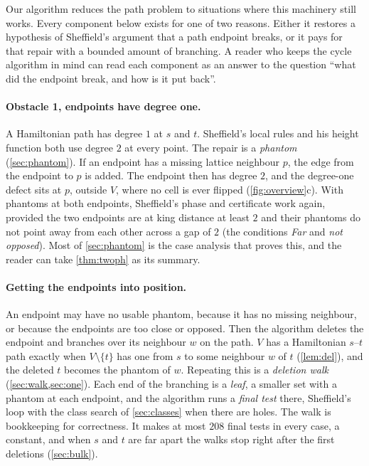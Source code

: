 \documentclass[11pt]{article}
\theoremstyle{plain}
\theoremstyle{definition}
\theoremstyle{remark}
\begin{document}
Our algorithm reduces the path problem to situations where this machinery still works.
Every component below exists for one of two reasons.
Either it restores a hypothesis of Sheffield's argument that a path endpoint breaks, or it pays for
that repair with a bounded amount of branching.
A reader who keeps the cycle algorithm in mind can read each component as an answer to the
question ``what did the endpoint break, and how is it put back''.

\paragraph{Obstacle 1, endpoints have degree one.}
A Hamiltonian path has degree $1$ at $s$ and $t$.
Sheffield's local rules and his height function both use degree $2$ at every point.
The repair is a \emph{phantom} (\cref{sec:phantom}).
If an endpoint has a missing lattice neighbour $p$, the edge from the endpoint to $p$ is added.
The endpoint then has degree $2$, and the degree-one defect sits at $p$, outside $V$, where no cell
is ever flipped (\cref{fig:overview}c).
With phantoms at both endpoints, Sheffield's phase and certificate work again, provided the two
endpoints are at king distance at least $2$ and their phantoms do not point away from each other
across a gap of $2$ (the conditions \emph{Far} and \emph{not opposed}).
Most of \cref{sec:phantom} is the case analysis that proves this, and the reader can take
\cref{thm:twoph} as its summary.

\paragraph{Getting the endpoints into position.}
An endpoint may have no usable phantom, because it has no missing neighbour, or because the
endpoints are too close or opposed.
Then the algorithm deletes the endpoint and branches over its neighbour $w$ on the path.
$V$ has a Hamiltonian $s$--$t$ path exactly when $V\setminus\{t\}$ has one from $s$ to some neighbour
$w$ of $t$ (\cref{lem:del}), and the deleted $t$ becomes the phantom of $w$.
Repeating this is a \emph{deletion walk} (\cref{sec:walk,sec:one}).
Each end of the branching is a \emph{leaf}, a smaller set with a phantom at each endpoint, and the
algorithm runs a \emph{final test} there, Sheffield's loop with the class search of
\cref{sec:classes} when there are holes.
The walk is bookkeeping for correctness.
It makes at most $208$ final tests in every case, a constant, and when $s$ and $t$ are far apart the
walks stop right after the first deletions (\cref{sec:bulk}).
\end{document}
